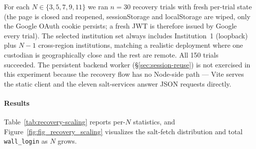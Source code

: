 For each $N \in \{3, 5, 7, 9, 11\}$ we ran $n=30$ recovery trials with
fresh per-trial state (the page is closed and reopened, sessionStorage and
localStorage are wiped, only the Google OAuth cookie persists; a fresh
JWT is therefore issued by Google every trial). The selected
institution set always includes Institution~1 (loopback) plus
$N{-}1$ cross-region institutions, matching a realistic deployment
where one custodian is geographically close and the rest are remote.
All 150 trials succeeded. The persistent backend worker
(\S\ref{sec:session-reuse}) is not exercised in this experiment because
the recovery flow has no Node-side path — Vite serves the static client
and the eleven salt-services answer JSON requests directly.

\paragraph{Results}

Table~\ref{tab:recovery-scaling} reports per-$N$ statistics, and
Figure~\ref{fig:fig_recovery_scaling} visualizes the salt-fetch
distribution and total \texttt{wall\_login} as $N$ grows.

